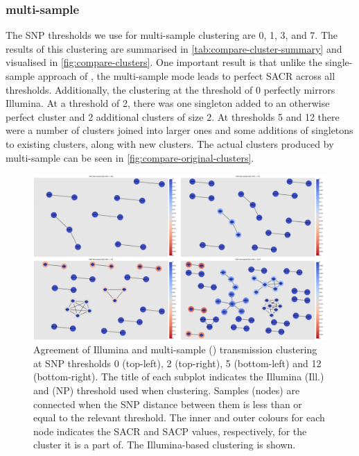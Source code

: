 \subsubsection{\pandora{} multi-sample}

The SNP thresholds we use for \pandora{} multi-sample clustering are 0, 1, 3, and 7. The results of this clustering are summarised in \autoref{tab:compare-cluster-summary} and visualised in \autoref{fig:compare-clusters}. One important result is that unlike the single-sample approach of \pandora{}, the multi-sample mode leads to perfect SACR across all thresholds. Additionally, the clustering at the threshold of 0 perfectly mirrors Illumina. At a threshold of 2, there was one singleton added to an otherwise perfect cluster and 2 additional clusters of size 2. At thresholds 5 and 12 there were a number of clusters joined into larger ones and some additions of singletons to existing clusters, along with new clusters. The actual clusters produced by \pandora{} multi-sample can be seen in \autoref{fig:compare-original-clusters}.

\begin{figure}
\begin{center}
\includegraphics[width=0.90\columnwidth]{Chapter2/Figs/pandora_compare_clusters.png}
\caption{{Agreement of Illumina and \pandora{} multi-sample (\ont{}) transmission clustering at SNP thresholds 0 (top-left), 2 (top-right), 5 (bottom-left) and 12 (bottom-right). The title of each subplot indicates the Illumina (Ill.) and \ont{} (NP) threshold used when clustering. Samples (nodes) are connected when the SNP distance between them is less than or equal to the relevant threshold. The inner and outer colours for each node indicates the SACR and SACP values, respectively, for the cluster it is a part of. The Illumina-based clustering is shown.
{\label{fig:compare-clusters}}%
}}
\end{center}
\end{figure}

